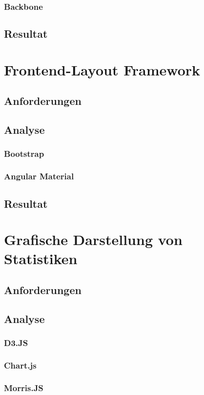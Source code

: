\documentclass[12pt,a4paper,oneside, 
liststotoc, 					%
bibtotoc,						%
titlepage, 						%
headsepline, 					%
BCOR6mm,						%
openany,							%
]{scrreprt}
\begin{document}
   \subsubsection{Backbone}
  \subsection{Resultat}
 \section{Frontend-Layout Framework}
  \subsection{Anforderungen}
  \subsection{Analyse}
   \subsubsection{Bootstrap}
   \subsubsection{Angular Material}
  \subsection{Resultat}
 \section{Grafische Darstellung von Statistiken}
  \subsection{Anforderungen}
  \subsection{Analyse}
   \subsubsection{D3.JS}
   \subsubsection{Chart.js}
   \subsubsection{Morris.JS}
\end{document}
